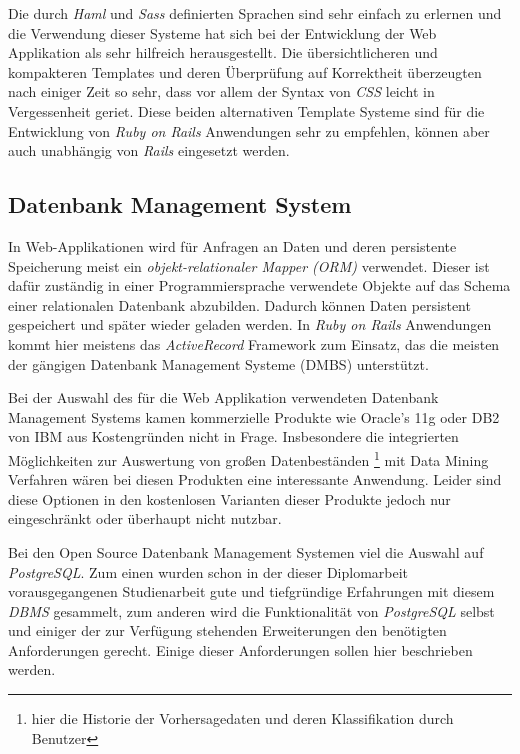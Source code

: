 Die durch \textit{Haml} und \textit{Sass} definierten Sprachen sind
sehr einfach zu erlernen und die Verwendung dieser Systeme hat sich
bei der Entwicklung der Web Applikation als sehr hilfreich
herausgestellt. Die übersichtlicheren und kompakteren Templates und
deren Überprüfung auf Korrektheit überzeugten nach einiger Zeit so
sehr, dass vor allem der Syntax von \textit{CSS} leicht in
Vergessenheit geriet. Diese beiden alternativen Template Systeme sind
für die Entwicklung von \textit{Ruby on Rails} Anwendungen sehr zu
empfehlen, können aber auch unabhängig von \textit{Rails} eingesetzt
werden.

\subsection{Datenbank Management System}

In Web-Applikationen wird für Anfragen an Daten und deren persistente
Speicherung meist ein \textit{objekt-relationaler Mapper (ORM)}
verwendet. Dieser ist dafür zuständig in einer Programmiersprache
verwendete Objekte auf das Schema einer relationalen Datenbank
abzubilden. Dadurch können Daten persistent gespeichert und später
wieder geladen werden. In \textit{Ruby on Rails} Anwendungen kommt
hier meistens das \textit{ActiveRecord} Framework zum Einsatz, das die
meisten der gängigen Datenbank Management Systeme (DMBS) unterstützt.

Bei der Auswahl des für die Web Applikation verwendeten Datenbank
Management Systems kamen kommerzielle Produkte wie Oracle's 11g oder
DB2 von IBM aus Kostengründen nicht in Frage. Insbesondere die
integrierten Möglichkeiten zur Auswertung von großen Datenbeständen
\footnote{hier die Historie der Vorhersagedaten und deren
  Klassifikation durch Benutzer} mit Data Mining Verfahren wären bei
diesen Produkten eine interessante Anwendung. Leider sind diese
Optionen in den kostenlosen Varianten dieser Produkte jedoch nur
eingeschränkt oder überhaupt nicht nutzbar.

Bei den Open Source Datenbank Management Systemen viel die Auswahl auf
\textit{PostgreSQL}. Zum einen wurden schon in der dieser Diplomarbeit
vorausgegangenen Studienarbeit gute und tiefgründige Erfahrungen mit
diesem \textit{DBMS} gesammelt, zum anderen wird die Funktionalität
von \textit{PostgreSQL} selbst und einiger der zur Verfügung stehenden
Erweiterungen den benötigten Anforderungen gerecht. Einige dieser
Anforderungen sollen hier beschrieben werden.

